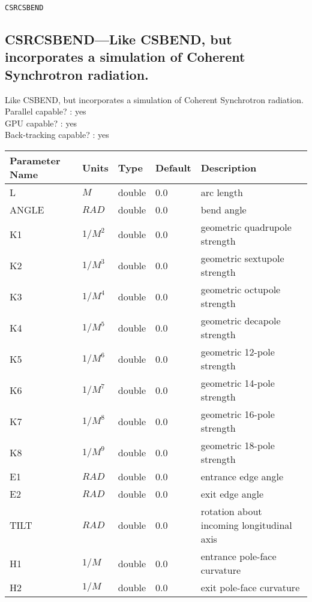 \vspace*{0.5in}

\newpage
\begin{center}{\Large\verb|CSRCSBEND|}\end{center}
\subsection{CSRCSBEND---Like CSBEND, but incorporates a simulation of Coherent Synchrotron radiation.}
Like CSBEND, but incorporates a simulation of Coherent Synchrotron radiation.
\\
Parallel capable? : yes\\
GPU capable? : yes\\
Back-tracking capable? : yes\\
\begin{tabular}{|l|l|l|l|p{\descwidth}|} \hline
Parameter Name & Units & Type & Default & Description \\ \hline 
L & $M$ & double &  0.0 & arc length  \\ \hline 
ANGLE & $RAD$ & double &  0.0 & bend angle  \\ \hline 
K1 & $1/M^{2}$ & double &  0.0 & geometric quadrupole strength  \\ \hline 
K2 & $1/M^{3}$ & double &  0.0 & geometric sextupole strength  \\ \hline 
K3 & $1/M^{4}$ & double &  0.0 & geometric octupole strength  \\ \hline 
K4 & $1/M^{5}$ & double &  0.0 & geometric decapole strength  \\ \hline 
K5 & $1/M^{6}$ & double &  0.0 & geometric 12-pole strength  \\ \hline 
K6 & $1/M^{7}$ & double &  0.0 & geometric 14-pole strength  \\ \hline 
K7 & $1/M^{8}$ & double &  0.0 & geometric 16-pole strength  \\ \hline 
K8 & $1/M^{9}$ & double &  0.0 & geometric 18-pole strength  \\ \hline 
E1 & $RAD$ & double &  0.0 & entrance edge angle  \\ \hline 
E2 & $RAD$ & double &  0.0 & exit edge angle  \\ \hline 
TILT & $RAD$ & double &  0.0 & rotation about incoming longitudinal axis  \\ \hline 
H1 & $1/M$ & double &  0.0 & entrance pole-face curvature  \\ \hline 
H2 & $1/M$ & double &  0.0 & exit pole-face curvature  \\ \hline 

\end{tabular}
